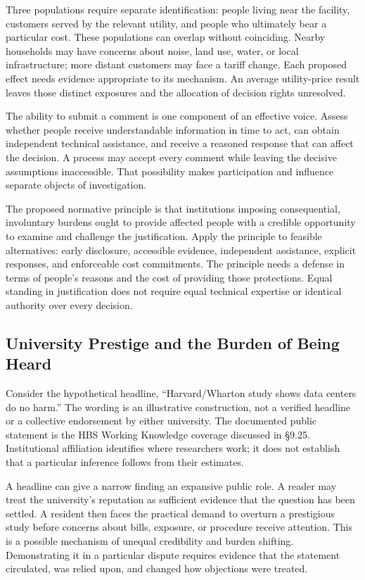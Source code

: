 Three populations require separate identification: people living near
the facility, customers served by the relevant utility, and people who
ultimately bear a particular cost. These populations can overlap without
coinciding. Nearby households may have concerns about noise, land use,
water, or local infrastructure; more distant customers may face a tariff
change. Each proposed effect needs evidence appropriate to its
mechanism. An average utility-price result leaves those distinct
exposures and the allocation of decision rights unresolved.

The ability to submit a comment is one component of an effective voice.
Assess whether people receive understandable information in time to act,
can obtain independent technical assistance, and receive a reasoned
response that can affect the decision. A process may accept every
comment while leaving the decisive assumptions inaccessible. That
possibility makes participation and influence separate objects of
investigation.

The proposed normative principle is that institutions imposing
consequential, involuntary burdens ought to provide affected people with
a credible opportunity to examine and challenge the justification. Apply
the principle to feasible alternatives: early disclosure, accessible
evidence, independent assistance, explicit responses, and enforceable
cost commitments. The principle needs a defense in terms of people's
reasons and the cost of providing those protections. Equal standing in
justification does not require equal technical expertise or identical
authority over every decision.

\hypertarget{M09-university-prestige-and-the-burden-of-being-heard}{%
\subsection{University Prestige and the Burden of Being
Heard}\label{M09-university-prestige-and-the-burden-of-being-heard}}

\noindent \noindent Consider the hypothetical headline, ``Harvard/Wharton study
shows data centers do no harm.'' The wording is an illustrative
construction, not a verified headline or a collective endorsement by
either university. The documented public statement is the HBS Working
Knowledge coverage discussed in §9.25. Institutional affiliation
identifies where researchers work; it does not establish that a
particular inference follows from their estimates.

A headline can give a narrow finding an expansive public role. A reader
may treat the university's reputation as sufficient evidence that the
question has been settled. A resident then faces the practical demand to
overturn a prestigious study before concerns about bills, exposure, or
procedure receive attention. This is a possible mechanism of unequal
credibility and burden shifting. Demonstrating it in a particular
dispute requires evidence that the statement circulated, was relied
upon, and changed how objections were treated.

